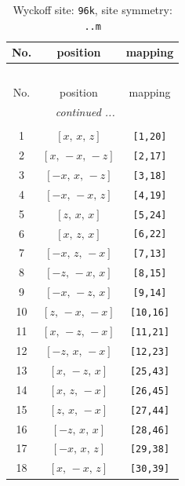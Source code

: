 \documentclass[fleqn,8pt]{jsarticle}
\begin{document}
\begin{longtable}{ccc}
\caption{Wyckoff site: {\tt 96k}, site symmetry: {\tt ..m}}
 \\
 \hline \hline
No. & position & mapping \\ \hline \endfirsthead

\multicolumn{2}{l}{\tablename\ \thetable{}} \\
 \hline \hline
No. & position & mapping \\ \hline \endhead

 \hline \hline
\multicolumn{2}{r}{\footnotesize\it continued ...} \\ \endfoot

 \hline \hline
\multicolumn{2}{r}{} \\ \endlastfoot

1 & $\left[ x,\, x,\, z \right]$ & {\tt [1,20]} \\ \hline
2 & $\left[ x,\, - x,\, - z \right]$ & {\tt [2,17]} \\ \hline
3 & $\left[ - x,\, x,\, - z \right]$ & {\tt [3,18]} \\ \hline
4 & $\left[ - x,\, - x,\, z \right]$ & {\tt [4,19]} \\ \hline
5 & $\left[ z,\, x,\, x \right]$ & {\tt [5,24]} \\ \hline
6 & $\left[ x,\, z,\, x \right]$ & {\tt [6,22]} \\ \hline
7 & $\left[ - x,\, z,\, - x \right]$ & {\tt [7,13]} \\ \hline
8 & $\left[ - z,\, - x,\, x \right]$ & {\tt [8,15]} \\ \hline
9 & $\left[ - x,\, - z,\, x \right]$ & {\tt [9,14]} \\ \hline
10 & $\left[ z,\, - x,\, - x \right]$ & {\tt [10,16]} \\ \hline
11 & $\left[ x,\, - z,\, - x \right]$ & {\tt [11,21]} \\ \hline
12 & $\left[ - z,\, x,\, - x \right]$ & {\tt [12,23]} \\ \hline
13 & $\left[ x,\, - z,\, x \right]$ & {\tt [25,43]} \\ \hline
14 & $\left[ x,\, z,\, - x \right]$ & {\tt [26,45]} \\ \hline
15 & $\left[ z,\, x,\, - x \right]$ & {\tt [27,44]} \\ \hline
16 & $\left[ - z,\, x,\, x \right]$ & {\tt [28,46]} \\ \hline
17 & $\left[ - x,\, x,\, z \right]$ & {\tt [29,38]} \\ \hline
18 & $\left[ x,\, - x,\, z \right]$ & {\tt [30,39]} \\ \hline

\end{longtable}
\end{document}
